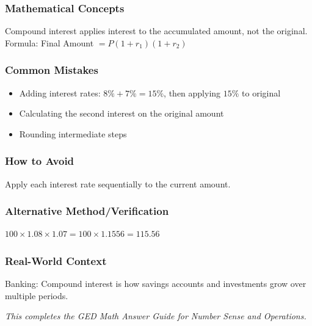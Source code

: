 \documentclass[12pt,a4paper]{article}
\begin{document}
\subsubsection*{Mathematical Concepts}
Compound interest applies interest to the accumulated amount, not the original. Formula: Final Amount $= P(1 + r_1)(1 + r_2)$

\subsubsection*{Common Mistakes}
\begin{itemize}
    \item Adding interest rates: $8\% + 7\% = 15\%$, then applying $15\%$ to original
    \item Calculating the second interest on the original amount
    \item Rounding intermediate steps
\end{itemize}

\subsubsection*{How to Avoid}
Apply each interest rate sequentially to the current amount.

\subsubsection*{Alternative Method/Verification}
$100 \times 1.08 \times 1.07 = 100 \times 1.1556 = 115.56$ 

\subsubsection*{Real-World Context}
Banking: Compound interest is how savings accounts and investments grow over multiple periods.

\vspace{1cm}

\noindent
\textit{This completes the GED Math Answer Guide for Number Sense and Operations.}
\end{document}

